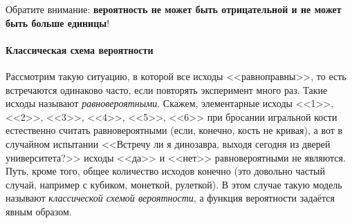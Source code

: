\documentclass[11pt]{article}
\begin{document}
\begin{center}
{
	}
\end{center}

Обратите внимание: \textbf{вероятность не может быть отрицательной и не может быть больше единицы}!

\paragraph{Классическая схема вероятности} Рассмотрим такую ситуацию, в которой все исходы <<равноправны>>, то есть встречаются одинаково часто, если повторять эксперимент много раз. Такие исходы называют \emph{равновероятными}. Скажем, элементарные исходы <<1>>, <<2>>, <<3>>, <<4>>, <<5>>, <<6>> при бросании игральной кости естественно считать равновероятными (если, конечно, кость не кривая), а вот в случайном испытании <<Встречу ли я динозавра, выходя сегодня из дверей университета?>> исходы <<да>> и <<нет>> равновероятными не являются. Путь, кроме того, общее количество исходов конечно (это довольно частый случай, например с кубиком, монеткой, рулеткой). В этом случае такую модель называют \emph{классической схемой вероятности}, а функция вероятности задаётся явным образом.
\end{document}
